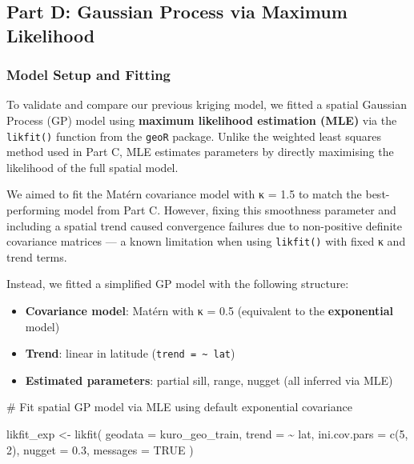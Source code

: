 \documentclass[
  11pt,
]{article}
\newenvironment{Shaded}{\begin{snugshade}}{\end{snugshade}}
\newcommand{\AttributeTok}[1]{\textcolor[rgb]{0.40,0.45,0.13}{#1}}
\newcommand{\CommentTok}[1]{\textcolor[rgb]{0.37,0.37,0.37}{#1}}
\newcommand{\ConstantTok}[1]{\textcolor[rgb]{0.56,0.35,0.01}{#1}}
\newcommand{\DecValTok}[1]{\textcolor[rgb]{0.68,0.00,0.00}{#1}}
\newcommand{\FloatTok}[1]{\textcolor[rgb]{0.68,0.00,0.00}{#1}}
\newcommand{\FunctionTok}[1]{\textcolor[rgb]{0.28,0.35,0.67}{#1}}
\newcommand{\NormalTok}[1]{\textcolor[rgb]{0.00,0.23,0.31}{#1}}
\newcommand{\OtherTok}[1]{\textcolor[rgb]{0.00,0.23,0.31}{#1}}
\newcommand{\SpecialCharTok}[1]{\textcolor[rgb]{0.37,0.37,0.37}{#1}}
\begin{document}
\subsection{Part D: Gaussian Process via Maximum
Likelihood}\label{part-d-gaussian-process-via-maximum-likelihood}

\subsubsection{Model Setup and Fitting}\label{model-setup-and-fitting}

To validate and compare our previous kriging model, we fitted a spatial
Gaussian Process (GP) model using \textbf{maximum likelihood estimation
(MLE)} via the \texttt{likfit()} function from the \texttt{geoR}
package. Unlike the weighted least squares method used in Part C, MLE
estimates parameters by directly maximising the likelihood of the full
spatial model.

We aimed to fit the Matérn covariance model with κ = 1.5 to match the
best-performing model from Part C. However, fixing this smoothness
parameter and including a spatial trend caused convergence failures due
to non-positive definite covariance matrices --- a known limitation when
using \texttt{likfit()} with fixed κ and trend terms.

Instead, we fitted a simplified GP model with the following structure:

\begin{itemize}
\item
  \textbf{Covariance model}: Matérn with κ = 0.5 (equivalent to the
  \textbf{exponential} model)
\item
  \textbf{Trend}: linear in latitude
  (\texttt{trend\ =\ \textasciitilde{}\ lat})
\item
  \textbf{Estimated parameters}: partial sill, range, nugget (all
  inferred via MLE)
\end{itemize}

\begin{Shaded}
\begin{Highlighting}[]
\CommentTok{\# Fit spatial GP model via MLE using default exponential covariance}

\NormalTok{likfit\_exp }\OtherTok{\textless{}{-}} \FunctionTok{likfit}\NormalTok{(}
  \AttributeTok{geodata =}\NormalTok{ kuro\_geo\_train,}
  \AttributeTok{trend =} \SpecialCharTok{\textasciitilde{}}\NormalTok{ lat,}
  \AttributeTok{ini.cov.pars =} \FunctionTok{c}\NormalTok{(}\DecValTok{5}\NormalTok{, }\DecValTok{2}\NormalTok{),}
  \AttributeTok{nugget =} \FloatTok{0.3}\NormalTok{,}
  \AttributeTok{messages =} \ConstantTok{TRUE}
\NormalTok{)}
\end{Highlighting}
\end{Shaded}
\end{document}
